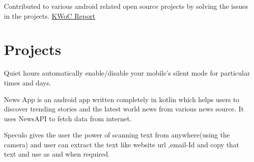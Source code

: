 \documentclass[]{deedy-resume-openfont}
\begin{document}
\begin{minipage}[t]{0.66\textwidth}
\begin{tightemize}\item Contributed to various android related open source projects by solving the issues in the projects. \href{https://medium.com/@rs729028/kharagpur-winter-of-code-my-start-to-open-source-contributions-ff8dc78d9b7c}{KWoC Report}
\end{tightemize}
\sectionsep



\section{Projects}

\begin{tightemize}\item Quiet hours automatically enable/disable your mobile's silent mode for particular times and days.
\end{tightemize}
\sectionsep

\begin{tightemize}\item News App is an android app written completely in kotlin which helps users to discover trending stories and the latest world news from various news source. It uses NewsAPI to fetch data from internet.
\end{tightemize}
\sectionsep

\begin{tightemize}\item Speculo gives the user the power of scanning text from anywhere(using the camera) and user can extract the text like website url ,email-Id and copy that text and use as and when required.
\end{tightemize}
\sectionsep



\end{minipage}
\end{document}
